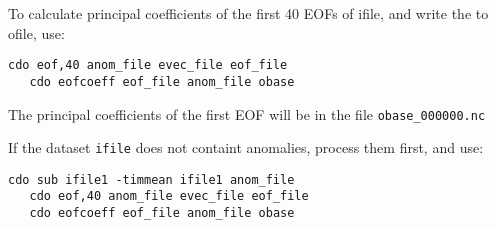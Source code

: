 \setlength{\miniwidth}{\textwidth}
\addtolength{\miniwidth}{-8mm}
\hspace*{8mm}\begin{minipage}{\miniwidth}
To calculate principal coefficients of the first 40 EOFs of ifile, 
and write the to ofile, use:
\begin{lstlisting}[backgroundcolor=\color{zebg}, basicstyle=\small]
   cdo eof,40 anom_file evec_file eof_file
   cdo eofcoeff eof_file anom_file obase
\end{lstlisting}
The principal coefficients of the first EOF will be in the file
{\tt obase\_000000.nc}

If the dataset {\tt ifile} does not containt anomalies, process them first,
and use:
\begin{lstlisting}[backgroundcolor=\color{zebg}, basicstyle=\small]
   cdo sub ifile1 -timmean ifile1 anom_file	
   cdo eof,40 anom_file evec_file eof_file
   cdo eofcoeff eof_file anom_file obase 	
\end{lstlisting}
\end{minipage}
\addtolength{\miniwidth}{8mm}

